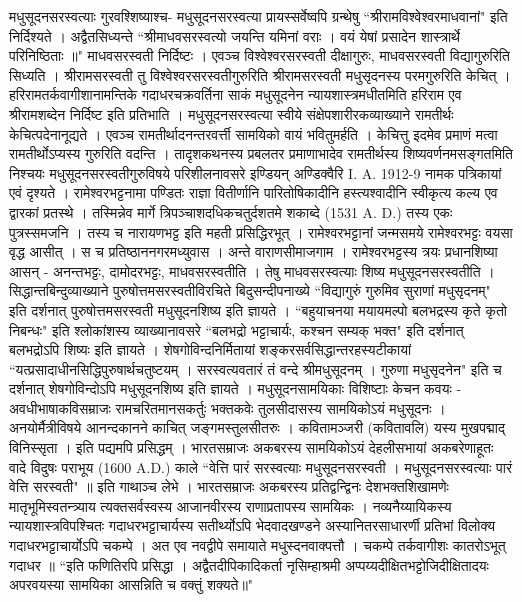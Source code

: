 मधुसूदनसरस्वत्याः गुरवश्शिष्याश्च-
मधुसूदनसरस्वत्या प्रायस्सर्वेष्वपि ग्रन्थेषु ``श्रीरामविश्वेश्वरमाधवानां" इति निर्दिश्यते । अद्वैतसिध्यन्ते
``श्रीमाधवसरस्वत्यो जयन्ति यमिनां वराः ।
वयं येषां प्रसादेन शास्त्रार्थे परिनिष्ठिताः ॥"
माधवसरस्वती निर्दिष्टः । एवञ्च विश्वेश्वरसरस्वती दीक्षागुरुः, माधवसरस्वती विद्यागुरुरिति सिध्यति । श्रीरामसरस्वती तु विश्वेश्वरसरस्वतीगुरुरिति श्रीरामसरस्वती मधुसृदनस्य परमगुरुरिति केचित् । हरिरामतर्कवागीशानामन्तिके गदाधरचक्रवर्तिना साकं मधुसूदनेन न्यायशास्त्रमधीतमिति हरिराम एव श्रीरामशब्देन निर्दिष्ट इति प्रतिभाति ।
मधुसूदनसरस्वत्या स्वीये संक्षेपशारीरकव्याख्याने रामतीर्थः केचित्पदेनानूद्यते । एवञ्च रामतीर्थादनन्तरवर्त्ती सामयिको वायं भवितुमर्हति । केचित्तु इदमेव प्रमाणं मत्वा रामतीर्थोऽप्यस्य गुरुरिति वदन्ति । तादृशकथनस्य प्रबलतर प्रमाणाभादेव रामतीर्थस्य शिष्यवर्णनमसङ्गतमिति निश्चयः
मधुसूदनसरस्वतीगुरुविषये परिशीलनावसरे इण्डियन् अण्डिक्वैरि I. A. 1912-9 नामक पत्रिकायां एवं दृश्यते ।
रामेश्वरभट्टनामा पण्डितः राज्ञा वितीर्णानि पारितोषिकादीनि हस्त्यश्वादीनि स्वीकृत्य कल्य एव द्वारकां प्रतस्थे । तस्मिन्नेव मार्गे त्रिपञ्चाशदधिकचतुर्दशतमे शकाब्दे (1531 A. D.) तस्य एकः पुत्रस्समजनि । तस्य च नारायणभट्ट इति महती प्रसिद्धिरभूत् । रामेश्वरभट्टानां जन्मसमये रामेश्वरभट्टः वयसा वृद्ध आसीत् । स च प्रतिष्ठाननगरमध्युवास । अन्ते वाराणसीमाजगाम । रामेश्वरभट्टस्य त्रयः प्रधानशिष्या आसन् - अनन्तभट्टः, दामोदरभट्टः, माधवसरस्वतीति । तेषु माधवसरस्वत्याः शिष्य मधुसूदनसरस्वतीति ।
सिद्धान्तबिन्दुव्याख्याने पुरुषोत्तमसरस्वतीविरचिते बिदुसन्दीपनाख्ये ``विद्यागुरुं गुरुमिव सुराणां मधुसृदनम्" इति दर्शनात् पुरुषोत्तमसरस्वती मधुसूदनशिष्य इति ज्ञायते । ``बहुयाचनया मयायमल्पो बलभद्रस्य कृते कृतो निबन्धः" इति श्लोकांशस्य व्याख्यानावसरे ``बलभद्रो भट्टाचार्यः, कश्चन सम्यक् भक्त" इति दर्शनात् बलभद्रोऽपि शिष्यः इति ज्ञायते । शेषगोविन्दनिर्मितायां शङ्करसर्वसिद्धान्तरहस्यटीकायां ``यत्प्रसादाधीनसिद्धिपुरुषार्थचतुष्टयम् । सरस्वत्यवतारं तं वन्दे श्रीमधुसूदनम् । गुरुणा मधुसृदनेन" इति च दर्शनात् शेषगोविन्दोऽपि मधुसूदनशिष्य इति ज्ञायते ।
मधुसूदनसामयिकाः विशिष्टाः केचन कवयः -
अवधीभाषाकविसम्राजः रामचरितमानसकर्तुः भक्तकवेः तुलसीदासस्य सामयिकोऽयं मधुसूदनः । अनयोर्मैत्रीविषये
आनन्दकानने काचित् जङ्गमस्तुलसीतरुः ।
कवितामञ्जरी (कवितावलि) यस्य मुखपद्माद् विनिस्सृता ।
इति पद्यमपि प्रसिद्धम् । भारतसम्राजः अकबरस्य सामयिकोऽयं देहलीसभायां अकबरेणाहूतः वादे विदुषः पराभूय (1600 A.D.) काले
``वेत्ति पारं सरस्वत्याः मधुसूदनसरस्वती ।
मधुसूदनसरस्वत्याः पारं वेत्ति सरस्वती" ॥ इति 
गाथाञ्च लेभे । भारतसम्राजः अकबरस्य प्रतिद्वन्द्विनः देशभक्तशिखामणेः मातृभूमिस्वतन्त्र्याय त्यक्तसर्वस्वस्य आजानवीरस्य राणाप्रतापस्य सामयिकः । नव्यनैय्यायिकस्य न्यायशास्त्रविपश्चितः गदाधरभट्टाचार्यस्य सतीर्थ्योऽपि भेदवादखण्डने अस्यानितरसाधारर्णी प्रतिभां विलोक्य गदाधरभट्टाचार्योऽपि चकम्पे । अत एव नवद्वीपे समायाते मधुस्दनवाक्पत्तौ । चकम्पे तर्कवागीशः कातरोऽभूत् गदाधर ॥ ``इति फणितिरपि प्रसिद्धा । अद्वैतदीपिकादिकर्ता नृसिम्हाश्रमी अप्पय्यदीक्षितभट्टोजिदीक्षितादयः अपरवयस्या सामयिका आसन्निति च वक्तुं शक्यते॥" 
